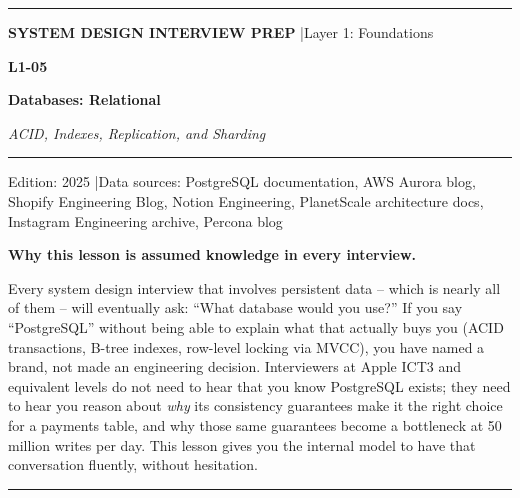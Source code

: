 \documentclass[11pt,a4paper]{article}
\begin{document}
\thispagestyle{empty}
\begin{center}
  \vspace*{2.5cm}
  {\color{highlight}\rule{\linewidth}{1.5pt}}
  \vspace{0.6cm}

  {\small\color{primary!60}\textbf{SYSTEM DESIGN INTERVIEW PREP} \quad|\quad Layer 1: Foundations}

  \vspace{0.4cm}
  {\fontsize{32}{40}\selectfont\bfseries\color{primary} L1-05}

  \vspace{0.3cm}
  {\fontsize{22}{28}\selectfont\bfseries\color{highlight} Databases: Relational}

  \vspace{0.2cm}
  {\large\color{primary!70}\itshape ACID, Indexes, Replication, and Sharding}

  \vspace{0.5cm}
  {\color{highlight}\rule{0.4\linewidth}{0.6pt}}

  \vspace{0.6cm}
  {\small\color{primary!60}
    Edition: 2025 \quad|\quad Data sources: PostgreSQL documentation, AWS Aurora blog,\\
    Shopify Engineering Blog, Notion Engineering, PlanetScale architecture docs,\\
    Instagram Engineering archive, Percona blog
  }

  \vspace{1.2cm}
  \begin{insightbox}
    \textbf{Why this lesson is assumed knowledge in every interview.}

    Every system design interview that involves persistent data -- which is nearly all of them -- will eventually ask: ``What database would you use?'' If you say ``PostgreSQL'' without being able to explain what that actually buys you (ACID transactions, B-tree indexes, row-level locking via MVCC), you have named a brand, not made an engineering decision. Interviewers at Apple ICT3 and equivalent levels do not need to hear that you know PostgreSQL exists; they need to hear you reason about \emph{why} its consistency guarantees make it the right choice for a payments table, and why those same guarantees become a bottleneck at 50 million writes per day. This lesson gives you the internal model to have that conversation fluently, without hesitation.
  \end{insightbox}

  \vspace{1cm}
  {\color{highlight}\rule{\linewidth}{1.5pt}}
\end{center}
\end{document}
